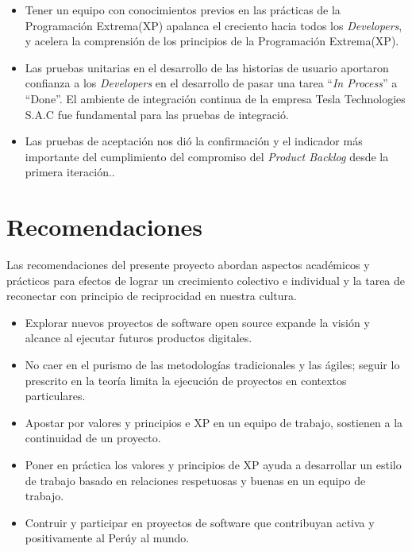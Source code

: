 \begin{spacing}{1.5}
\begin{itemize}
	\item Tener un equipo con conocimientos previos en las pr\'{a}cticas de la Programaci\'{o}n Extrema(XP) apalanca el creciento hacia todos los \textit{Developers}, y acelera la comprensi\'{o}n de los principios de la Programaci\'{o}n Extrema(XP).
	
	\item Las pruebas unitarias en el desarrollo de las historias de usuario aportaron confianza a los \textit{Developers} en el desarrollo de pasar una tarea ``\textit{In Process}'' a ``Done''. El ambiente de integraci\'{o}n continua de la empresa Tesla Technologies S.A.C fue fundamental para las pruebas de integraci\'{o}.
	
	\item Las pruebas de aceptaci\'{o}n nos di\'{o} la confirmaci\'{o}n y el indicador m\'{a}s importante del cumplimiento del compromiso del \textit{Product Backlog} desde la primera iteraci\'{o}n..
	
\end{itemize}
\clearpage
\section{Recomendaciones}
	Las recomendaciones del presente proyecto abordan aspectos acad\'{e}micos y pr\'{a}cticos para efectos de lograr un crecimiento colectivo e individual y la tarea de reconectar con principio de reciprocidad en nuestra cultura.
	
	\begin{itemize}
		\item Explorar nuevos proyectos de software open source expande la visión y alcance al ejecutar futuros productos digitales.
		\item No caer en el purismo de las metodolog\'{i}as tradicionales y las \'{a}giles; seguir lo prescrito en la teor\'{i}a limita la ejecuci\'{o}n de proyectos en contextos particulares.
		\item Apostar por valores y principios e XP en un equipo de trabajo, sostienen a la continuidad de un proyecto.
		\item Poner en pr\'{a}ctica los valores y principios de XP ayuda a desarrollar un estilo de trabajo basado en relaciones respetuosas y buenas en un equipo de trabajo. 
		\item Contruir y participar en proyectos de software que contribuyan activa y positivamente al Per\'{u}y al mundo.
	\end{itemize}
\end{spacing}